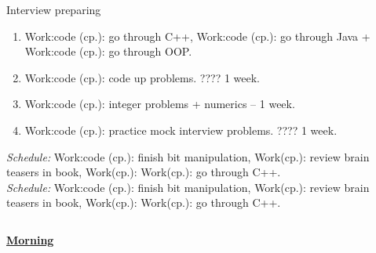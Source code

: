 {\begin{columns}
\begin{column}{0.5\columnwidth}
\begin{block}{Interview preparing}
\begin{enumerate}
\tiny \item \tiny Work:code (cp.): go through C++, Work:code (cp.): go
through Java + Work:code (cp.): go through OOP. 
\item \tiny Work:code (cp.): code up problems.  ???? 1 week.
\item \tiny Work:code (cp.): integer problems + numerics   -- 1 week.
\item \tiny Work:code (cp.): practice mock interview problems. ???? 1  week.
\end{enumerate}
{\tiny {\it {\tiny Schedule:}} Work:code (cp.): finish bit
  manipulation, Work(cp.): review brain teasers in book, Work(cp.):
  Work(cp.): go through C++.} \\
{\tiny {\it {\tiny Schedule:}} Work:code (cp.): finish bit manipulation, Work(cp.): review brain teasers in book, Work(cp.): Work(cp.): go through C++.}\\
\end{block}

\end{column}

\end{columns}
}
\underline{\bf Morning}
